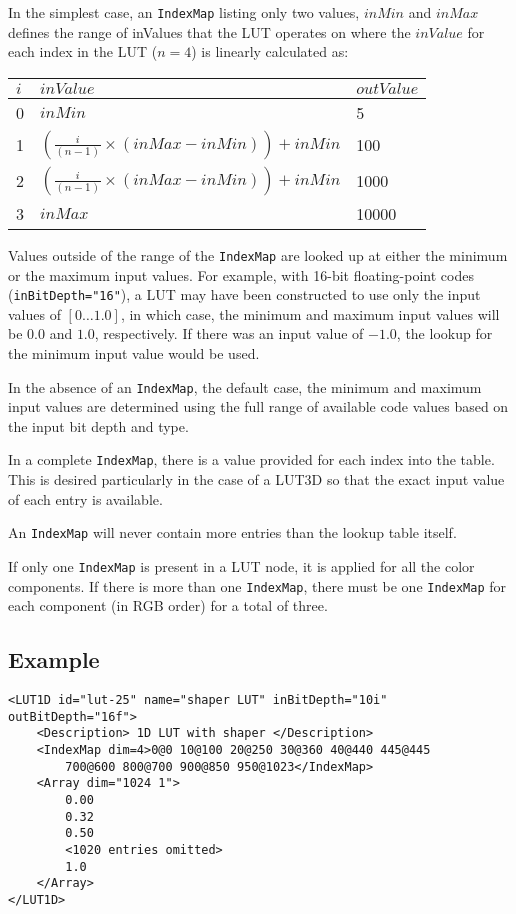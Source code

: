 In the simplest case, an \texttt{IndexMap} listing only two values, $inMin$ and $inMax$ defines the range of inValues that the LUT operates on where the $inValue$  for each index in the LUT ($n=4$) is linearly calculated as:

\begin{center}
\begin{tabularx}{3.5in}{|l|X|l|}
\hline
$i$ & $inValue$ & $outValue$ \\\hline
0 & $inMin$	& 5 \\\hline
1 & $\left(\frac{i}{(n-1)}\times(inMax-inMin)\right)+inMin$	& 100 \\\hline
2 & $\left(\frac{i}{(n-1)}\times(inMax-inMin)\right)+inMin$	& 1000 \\\hline
3 & $inMax$ & 10000 \\\hline
\end{tabularx}
\end{center}

Values outside of the range of the \texttt{IndexMap} are looked up at either the minimum or the maximum input values. For example, with 16-bit floating-point codes (\texttt{inBitDepth="16"}), a LUT may have been constructed to use only the input values of $[0 \ldots 1.0]$, in which case, the minimum and maximum input values will be $0.0$ and $1.0$, respectively. If there was an input value of $-1.0$, the lookup for the minimum input value would be used.

In the absence of an \texttt{IndexMap}, the default case, the minimum and maximum input values are determined using the full range of available code values based on the input bit depth and type.

In a complete \texttt{IndexMap}, there is a value provided for each index into the table. This is desired particularly in the case of a LUT3D so that the exact input value of each entry is available.  

An \texttt{IndexMap} will never contain more entries than the lookup table itself.

If only one \texttt{IndexMap} is present in a LUT node, it is applied for all the color components. If there is more than one \texttt{IndexMap}, there must be one \texttt{IndexMap} for each component (in RGB order) for a total of three.


\subsection*{Example}

\lstset{frame=single}
\begin{lstlisting}[caption=Example of a partially enumerated ``Shaper LUT'']
<LUT1D id="lut-25" name="shaper LUT" inBitDepth="10i" outBitDepth="16f">
	<Description> 1D LUT with shaper </Description>
	<IndexMap dim=4>0@0 10@100 20@250 30@360 40@440 445@445 
	    700@600 800@700 900@850 950@1023</IndexMap>
	<Array dim="1024 1">
        0.00
        0.32
        0.50
        <1020 entries omitted>
        1.0
	</Array>
</LUT1D>
\end{lstlisting}

